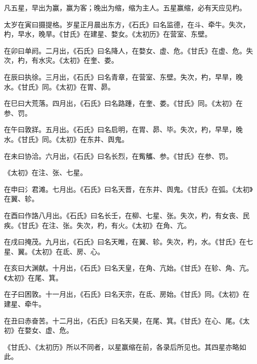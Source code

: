 \documentclass[12pt,UTF8]{ctexbook}
\begin{document}
凡五星，早出为赢，赢为客；晚出为缩，缩为主人。五星赢缩，必有天应见杓。



太岁在寅曰摄提格。岁星正月晨出东方，《石氏》曰名监德，在斗、牵牛。失次，杓，早水，晚旱。《甘氏》在建星、婺女。《太初历》在营室、东壁。



在卯曰单阏。二月出，《石氏》曰名降人，在婺女、虚、危。《甘氏》在虚、危。失次，杓，有水灾。《太初》在奎、娄。



在辰曰执徐。三月出，《石氏》曰名青章，在营室、东壁。失次，杓，早旱，晚水。《甘氏》同。《太初》在胃、昴。



在巳曰大荒落。四月出，《石氏》曰名路踵，在奎、娄。《甘氏》同。《太初》在参、罚。



在午曰敦牂。五月出。《石氏》曰名启明，在胃、昴、毕。失次，杓，早旱，晚水。《甘氏》同。《太初》在东井、舆鬼。



在未曰协洽。六月出，《石氏》曰名长烈，在觜觿、参。《甘氏》在参、罚。



《太初》在注、张、七星。



在申曰氵君滩。七月出。《石氏》曰名天晋，在东井、舆鬼。《甘氏》在弧。《太初》在翼、轸。



在酉曰作詻八月出。《石氏》曰名长壬，在柳、七星、张。失次，杓，有女丧、民疾。《甘氏》在注、张。失次，杓，有火。《太初》在角、亢。



在戌曰掩茂。九月出，《石氏》曰名天睢，在翼、轸。失次，杓，水。《甘氏》在七星、翼。《太初》在氐、房、心。



在亥曰大渊献。十月出，《石氏》曰名天皇，在角、亢始。《甘氏》在轸、角、亢。《太初》在尾、箕。



在子曰困敦。十一月出，《石氏》曰名天宗，在氐、房始。《甘氏》同。《太初》在建星、牵牛。



在丑曰赤奋苦。十二月出，《石氏》曰名天昊，在尾、箕。《甘氏》在心、尾。《太初》在婺女、虚、危。



《甘氏》、《太初历》所以不同者，以星赢缩在前，各录后所见也。其四星亦略如此。
\end{document}
